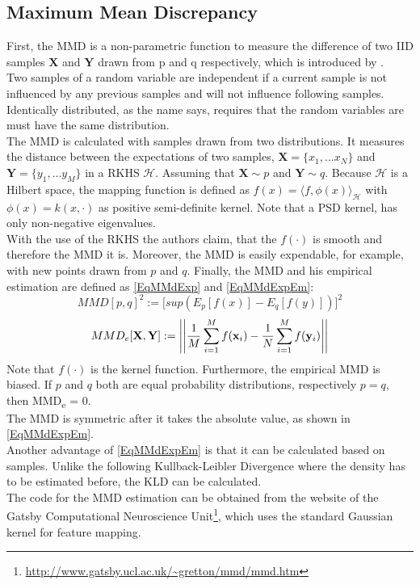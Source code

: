 \subsection{Maximum Mean Discrepancy}\label{TlSubSecMMD}
First, the \acl{MMD} is a non-parametric function to measure the difference of two \ac{IID} samples $\mathbf{X}$ and $\mathbf{Y}$ drawn from p and q respectively, which is introduced by \cite[p. 724-728]{Gretton.2012}.\\
Two samples of a random variable are independent if a current sample is not influenced by any previous samples and will not influence following samples.
Identically  distributed, as the name says, requires that the random variables are must have the same distribution.\cite[p. 7-8]{Czado.2011}\\
The \acs{MMD} is calculated with samples drawn from two distributions.
It measures the distance between the expectations of two samples, $\textbf{X}=\{x_1,...x_N\}$ and $\textbf{Y}=\{y_1,...y_M\}$
in a \ac{RKHS} $\mathcal{H}$.
Assuming that $\mathbf{X} \sim p$ and $\mathbf{Y} \sim q$.
Because $\mathcal{H}$ is a Hilbert space, the mapping function is defined as $f(x) = \langle f,\phi(x) \rangle_\mathcal{H}$ with $\phi(x) = k(x,\cdot)$ as positive semi-definite kernel.
Note that a \ac{PSD} kernel, has only non-negative eigenvalues.\cite[p. 30]{Scholkopf.2001}\\
With the use of the \acs{RKHS} the authors claim, that the $f(\cdot)$ is smooth and therefore the \acs{MMD} it is. 
Moreover, the \acs{MMD} is easily expendable, for example, with new points drawn from $p$ and $q$.
Finally, the \acs{MMD} and his empirical estimation are defined as \eqref{EqMMdExp} and \eqref{EqMMdExpEm}:\cite[p. 726-727]{Gretton.2012}
\begin{equation}\label{EqMMdExp}
MMD[p,q]^2:=\big[sup(E_{p}[f(x)] - E_{ q}[f(y)])\big]^2
\end{equation}
\begin{equation}\label{EqMMdExpEm}
MMD_e[\mathbf{X},\mathbf{Y}]:= \left\vert\left\vert\frac{1}{M}\sum_{i=1}^{M}f(\mathbf{x}_i) - \frac{1}{N}\sum_{i=1}^{M}f(\mathbf{y}_i)\right\vert\right\vert
\end{equation}
Note that $f(\cdot)$ is the kernel function.
Furthermore, the empirical \acs{MMD} is biased.
If $p$ and $q$ both are equal probability distributions, respectively $p = q$, then \ac{MMD}\textsubscript{e} = 0.\cite[p. 726-727]{Gretton.2012}\\
The \acs{MMD} is symmetric after it takes the absolute value, as shown in \eqref{EqMMdExpEm}.\\
Another advantage of \eqref{EqMMdExpEm} is that it can be calculated based on samples.
Unlike the following Kullback-Leibler Divergence where the density has to be estimated before, the \acs{KLD} can be calculated.\cite{Long.2015}\\
The code for the \acs{MMD} estimation can be obtained from the website of the Gatsby Computational Neuroscience Unit\footnote{\url{http://www.gatsby.ucl.ac.uk/~gretton/mmd/mmd.htm}}, which uses the standard Gaussian kernel for feature mapping.

